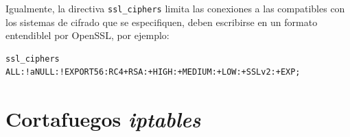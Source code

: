 \documentclass{article}
\begin{document}
Igualmente, la directiva \texttt{ssl\_ciphers} limita las conexiones a las compatibles con los sistemas de cifrado que se especifiquen,
deben escribirse en un formato entendiblel por OpenSSL, por ejemplo:
\begin{Verbatim}
ssl_ciphers ALL:!aNULL:!EXPORT56:RC4+RSA:+HIGH:+MEDIUM:+LOW:+SSLv2:+EXP;
\end{Verbatim}

\section{Cortafuegos \emph{iptables}}
\end{document}
